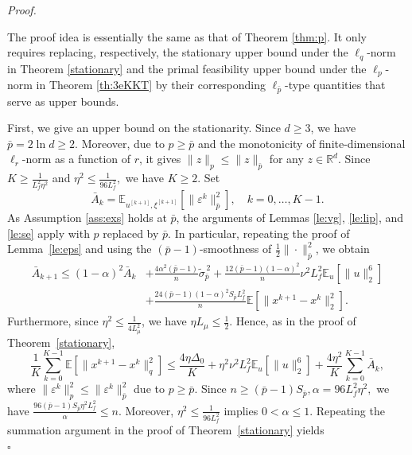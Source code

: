 \documentclass[11pt]{article}
\newenvironment{proof}[1][Proof]{%
    \par\noindent\textit{#1.}\enspace
  }{%
    \hfill\ensuremath{\square}\par
  }%
\numberwithin{equation}{section}
\newcommand{\E}{\mathbb{E}}
\begin{document}
\begin{proof}
The proof idea is essentially the same as that of Theorem \ref{thm:p}. It only requires replacing, respectively, the stationary upper bound under the \(\ell_q\)-norm in Theorem \ref{stationary} and the primal feasibility upper bound under the \(\ell_p\)-norm in Theorem \ref{th:3eKKT} by their corresponding \(\ell_{\bar p}\)-type quantities that serve as upper bounds.  

First, we give an upper bound on the stationarity. Since \(d\ge3\), we have \(\bar p=2\ln d\ge2\).  Moreover,
due to \(p\ge\bar p\) and  the monotonicity of finite-dimensional
\(\ell_r\)-norm as a function of \(r\), it gives \( \|z\|_p\le \|z\|_{\bar p}\)
for any \(    z\in\mathbb R^d.\)
Since
\(K\ge \frac{1}{L_f^2\eta^2}\)
and
\(\eta^2\le\frac{1}{96L_f^2},
\)
we have \(K\ge2\). Set
\[
\bar A_k
=\E_{u^{[k+1]},\xi^{[k+1]}}
  [\|\varepsilon^k\|_{\bar p}^2], \quad  k=0,\ldots,K-1.
\] 
As Assumption \ref{ass:exs} holds at \(\bar p\), the arguments
of Lemmas \ref{le:vg}, \ref{le:lip}, and \ref{le:se} apply with
\(p\) replaced by \(\bar p\).
In particular, repeating the proof of Lemma~\ref{le:eps} and using
the \((\bar p-1)\)-smoothness of
\(\frac12\|\cdot\|_{\bar p}^2\), we obtain
\begin{align*}
\bar A_{k+1}
\leq
(1-\alpha)^2\bar A_k
&+\frac{4\alpha^2(\bar p-1)}{n}
    \tilde\sigma_{\bar p}^{\,2} +
\frac{12(\bar p-1)(1-\alpha)^2}{n}
    \nu^2L_f^2\E_u[\|u\|_2^6]\\
&+
\frac{24(\bar p-1)(1-\alpha)^2S_{\bar p}L_f^2}{n}
    \E[\|x^{k+1}-x^k\|_2^2].   
\end{align*}
Furthermore, since
\(\eta^2\le\frac{1}{4L_\mu^2}\), we have
\(\eta L_\mu\le\frac{1}{2}\). Hence, as in the proof of
Theorem~\ref{stationary},
\[
\frac1K\sum_{k=0}^{K-1}
\E[\|x^{k+1}-x^k\|_q^2]
\leq{}
\frac{4\eta\Delta_0}{K}
+\eta^2\nu^2L_f^2\E_u[\|u\|_2^6]  +
\frac{4\eta^2}{K}
\sum_{k=0}^{K-1}\bar A_k,
\]
where %
\(\|\varepsilon^k\|_p^2\le \|\varepsilon^k\|_{\bar p}^2\) due to $p\ge \bar p$.
Since
\( n\ge(\bar p-1)S_{\bar p},
    \alpha=96L_f^2\eta^2,
\)
we have
\(\frac{96(\bar p-1)S_{\bar p}\eta^2L_f^2}{\alpha}
    \le n.\)
Moreover,
\(\eta^2\le\frac{1}{96L_f^2}\) implies \(0<\alpha\le1\).
Repeating the summation argument in the proof of
Theorem~\ref{stationary}  yields
\begin{equation}\label{eq:pinf-evar}

\end{equation}
\end{proof}
\end{document}
